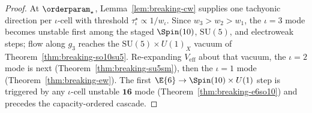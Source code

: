 \begin{proof}
At $\orderparam_\star$, Lemma~\ref{lem:breaking-cw} supplies one tachyonic
direction per $\iota$-cell with threshold $\tau_\iota^\star\propto 1/w_\iota$.
Since $w_3>w_2>w_1$, the $\iota=3$ mode becomes unstable first among the staged
$\Spin(10)$, $\mathrm{SU}(5)$, and electroweak steps; flow along $g_3$ reaches
the $\mathrm{SU}(5)\times U(1)_X$ vacuum of Theorem~\ref{thm:breaking-so10su5}.
Re-expanding $V_{\mathrm{eff}}$ about that vacuum, the $\iota=2$ mode is next
(Theorem~\ref{thm:breaking-su5sm}), then the $\iota=1$ mode
(Theorem~\ref{thm:breaking-ew}). The first $\E{6}\to\Spin(10)\times U(1)$ step
is triggered by any $\iota$-cell unstable $\mathbf{16}$ mode
(Theorem~\ref{thm:breaking-e6so10}) and precedes the capacity-ordered cascade.
\end{proof}

